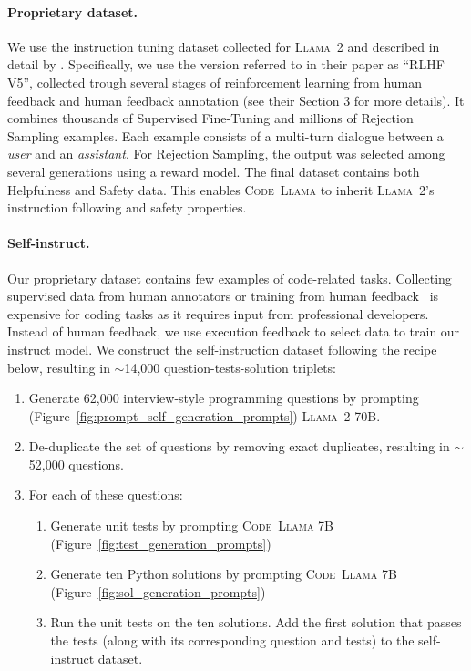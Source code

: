 \documentclass[10pt]{article}
\newcommand{\model}{\textsc{Code~Llama}\xspace}
\newcommand{\llamavtwo}{\textsc{Llama~2}\xspace}
\begin{document}
\paragraph{Proprietary dataset.}
We use the instruction tuning dataset collected for \llamavtwo and described in detail by \citet{touvron2023llamav2}. Specifically, we use the version referred to in their paper as ``RLHF V5'',  collected trough several stages of reinforcement learning from human feedback and human feedback annotation  (see their Section 3 for more details). It combines thousands of Supervised Fine-Tuning and millions of Rejection Sampling examples. Each example consists of a multi-turn  dialogue between a \emph{user} and an \emph{assistant}. For Rejection Sampling, the output was selected among several generations using a reward model. The final dataset contains both Helpfulness and Safety data. This enables \model to inherit \llamavtwo's instruction following and safety properties.


\paragraph{Self-instruct.}
Our proprietary dataset contains few examples of code-related tasks. 
Collecting supervised data from human annotators or training from human feedback~\citep{ouyang2022training} is expensive for coding tasks as it requires input from professional developers. 
Instead of human feedback, we use execution feedback to select data to train our instruct model. We construct the self-instruction dataset following the recipe below, resulting in $\sim$14,000 question-tests-solution triplets:

\begin{enumerate}
 \item Generate 62,000 interview-style programming questions by prompting (Figure~\ref{fig:prompt_self_generation_prompts}) \llamavtwo70B.
 \item De-duplicate the set of questions by removing exact duplicates, resulting in $\sim$52,000 questions.
 \item For each of these questions:
 \begin{enumerate}
    \item Generate unit tests by prompting \model7B (Figure~\ref{fig:test_generation_prompts})
    \item Generate ten Python solutions by prompting \model7B (Figure~\ref{fig:sol_generation_prompts})
    \item Run the unit tests on the ten solutions. Add the first solution that passes the tests (along with its corresponding question and tests) to the self-instruct dataset.
 \end{enumerate}
\end{enumerate}
\end{document}
